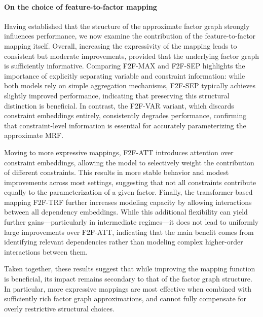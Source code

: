 \paragraph{On the choice of feature-to-factor mapping}
Having established that the structure of the approximate factor graph strongly influences performance, we now examine the contribution of the feature-to-factor mapping itself. Overall, increasing the expressivity of the mapping leads to consistent but moderate improvements, provided that the underlying factor graph is sufficiently informative. Comparing F2F-MAX and F2F-SEP highlights the importance of explicitly separating variable and constraint information: while both models rely on simple aggregation mechanisms, F2F-SEP typically achieves slightly improved performance, indicating that preserving this structural distinction is beneficial. In contrast, the F2F-VAR variant, which discards constraint embeddings entirely, consistently degrades performance, confirming that constraint-level information is essential for accurately parameterizing the approximate MRF.

Moving to more expressive mappings, F2F-ATT introduces attention over constraint embeddings, allowing the model to selectively weight the contribution of different constraints. This results in more stable behavior and modest improvements across most settings, suggesting that not all constraints contribute equally to the parameterization of a given factor. Finally, the transformer-based mapping F2F-TRF further increases modeling capacity by allowing interactions between all dependency embeddings. While this additional flexibility can yield further gains—particularly in intermediate regimes—it does not lead to uniformly large improvements over F2F-ATT, indicating that the main benefit comes from identifying relevant dependencies rather than modeling complex higher-order interactions between them.

Taken together, these results suggest that while improving the mapping function is beneficial, its impact remains secondary to that of the factor graph structure. In particular, more expressive mappings are most effective when combined with sufficiently rich factor graph approximations, and cannot fully compensate for overly restrictive structural choices.

